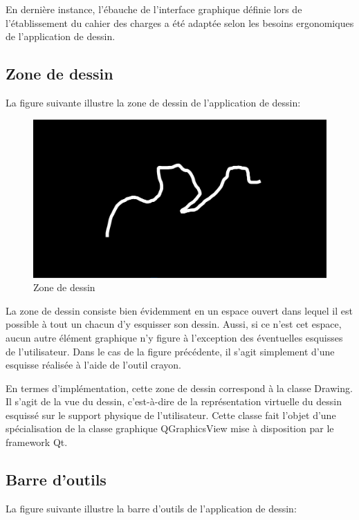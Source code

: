 \documentclass[11pt,a4paper,oldfontcommands]{memoir}
\begin{document}
En dernière instance, l'ébauche de l'interface graphique définie lors de l'établissement du cahier des charges a été adaptée selon les besoins ergonomiques de l'application de dessin.

\subsection{Zone de dessin}

La figure suivante illustre la zone de dessin de l'application de dessin:

\begin{figure}[h]
\centering
\includegraphics[scale=0.4]{images/drawing-area.png}
\caption{Zone de dessin}
\end{figure}

La zone de dessin consiste bien évidemment en un espace ouvert dans lequel il est possible à tout un chacun d'y esquisser son dessin. Aussi, si ce n'est cet espace, aucun autre élément graphique n'y figure à l'exception des éventuelles esquisses de l'utilisateur. Dans le cas de la figure précédente, il s'agit simplement d'une esquisse réalisée à l'aide de l'outil crayon.

En termes d'implémentation, cette zone de dessin correspond à la classe Drawing. Il s'agit de la vue du dessin, c'est-à-dire de la représentation virtuelle du dessin esquissé sur le support physique de l'utilisateur. Cette classe fait l'objet d'une spécialisation de la classe graphique QGraphicsView mise à disposition par le framework Qt.

\newpage

\subsection{Barre d'outils}

La figure suivante illustre la barre d'outils de l'application de dessin:
\end{document}
